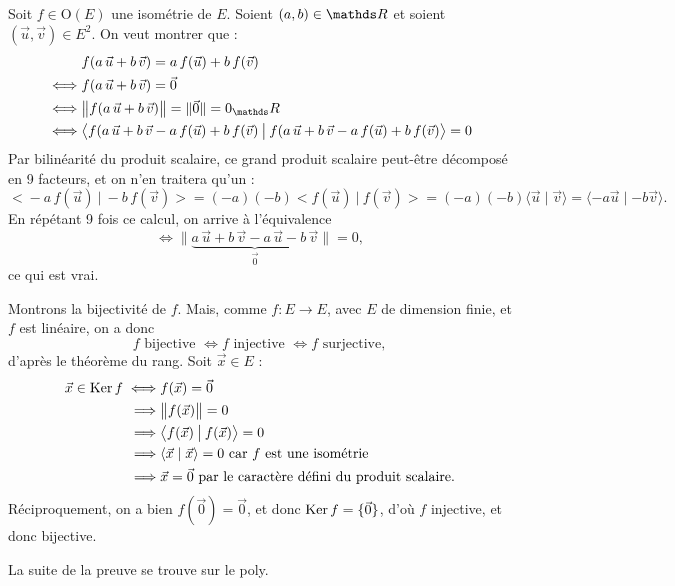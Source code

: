 \begin{prv}
	Soit $f \in \mathrm{O}(E)$\/ une isométrie de $E$.
	Soient $(a, b) \in \R$\/ et soient $(\vec{u}, \vec{v}) \in E^2$. On veut montrer que :
	\begin{align*}
		&f(a\,\vec{u} + b\,\vec{v}) = a\,f(\vec{u}) + b\,f(\vec{v})\\
		\iff& f(a\,\vec{u} + b\, \vec{v}) = \vec{0} \\
		\iff& \big\|f(a\,\vec{u} + b\, \vec{v})\big\| = \|\vec{0}\| = 0_\R \\
		\iff& \big< f(a\,\vec{u} + b\, \vec{v} - a\,f(\vec{u}) + b\,f(\vec{v}) \:\big|\: f(a\,\vec{u} + b\, \vec{v} - a\,f(\vec{u}) + b\,f(\vec{v})\big> = 0 \\
	\end{align*}
	Par bilinéarité du produit scalaire, ce grand produit scalaire peut-être décomposé en 9 facteurs, et on n'en traitera qu'un : \[
		\big< -a\,f(\vec{u}) \:\big|\: -b\,f(\vec{v})\big> = (-a)(-b) \big<f(\vec{u})\:\big|\: f(\vec{v})\big> = (-a)(-b) \langle \vec{u}  \mid \vec{v} \rangle  = \langle {-a} \vec{u}  \mid {-b}\vec{v}\rangle
	.\] En répétant 9 fois ce calcul, on arrive à l'équivalence \[
		\iff \| \underbrace{a\,\vec{u} + b\,\vec{v} - a\, \vec{u} - b\, \vec{v}}_{\vec{0}} \| = 0,
	\] ce qui est vrai.

	Montrons la bijectivité de $f$. Mais, comme $f : E \to E$, avec $E$\/ de dimension finie, et $f$\/ est linéaire, on a donc \[
		f \text{ bijective } \iff f \text{ injective } \iff f \text{ surjective}
	,\] d'après le théorème du rang.
	Soit $\vec{x} \in E$ :
	\begin{align*}
		\vec{x} \in \operatorname{Ker} f \iff& f(\vec{x}) = \vec{0} \\
		\implies& \big\| f(\vec{x})\big\| = 0\\
		\implies& \big<f(\vec{x})\:\big|\: f(\vec{x})\big> = 0\\
		\implies& \langle \vec{x} \mid \vec{x}\rangle = 0 \text{ car } f \text{ est une isométrie}\\
		\implies& \vec{x} = \vec{0} \text{ par le caractère défini du produit scalaire}.
	\end{align*}
	Réciproquement, on a bien $f(\vec{0}) = \vec{0}$, et donc $\operatorname{Ker} f = \{\vec{0}\}$, d'où $f$\/ injective, et donc bijective.

	La suite de la preuve se trouve sur le poly.
\end{prv}

